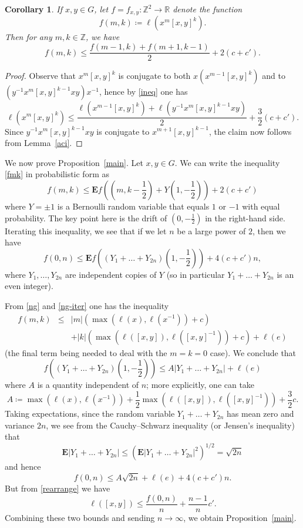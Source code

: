 \documentclass[11pt,a4paper,reqno]{amsart}
\numberwithin{equation}{section}
\theoremstyle{plain}
\newtheorem{corollary}[equation]{Corollary}
\theoremstyle{definition}
\newcommand\R{\mathbb{R}}
\newcommand\Z{\mathbb{Z}}
\newcommand\norm[1]{\ell({#1})}   %
\begin{document}
\begin{corollary}
If $x,y \in G$, let $f = f_{x,y}: \Z^2 \to \R$ denote the function
\[
f(m,k) \coloneqq \norm{ x^m [x,y]^k }.
\]
Then for any $m,k \in \Z$, we have
\begin{equation}\label{fmk}
 f(m,k) \leq \frac{f(m-1,k) + f(m+1,k-1)}{2} + 2(c + c').
\end{equation}
\end{corollary}

\begin{proof}
Observe that $x^m [x,y]^k$ is conjugate to both $x (x^{m-1} [x,y]^k)$ and
to $(y^{-1} x^m [x,y]^{k-1} xy) x^{-1}$, hence by \eqref{ineq} one has
\[
\norm{ x^m [x,y]^k } \leq \frac{\norm{ x^{m-1} [x,y]^k } + \norm{ y^{-1}
x^{m} [x,y]^{k-1} xy }}{2} + \frac{3}{2} (c + c').
\]
Since $y^{-1} x^{m} [x,y]^{k-1} xy $ is conjugate to $x^{m+1}
[x,y]^{k-1}$, the claim now follows from Lemma~\ref{aci}.
\end{proof}

We now prove Proposition~\ref{main}. Let $x,y \in G$.  We can
write the inequality \eqref{fmk} in probabilistic form as
\[
f(m,k) \leq {\mathbf E} f\left( \left(m,k-\frac{1}{2}\right) + Y
\left(1,-\frac{1}{2}\right) \right) + 2(c + c')
\]
where $Y = \pm 1$ is a Bernoulli random variable that equals $1$ or $-1$
with equal probability.  The key point here is the drift of $\left(0,
-\frac{1}{2} \right)$ in the right-hand side.
Iterating this inequality, we see that if we let
$n$ be a large power of $2$, then we have
\[
f( 0, n) \leq {\mathbf E} f\left( (Y_1 + \dots + Y_{2n}) \left(1,
-\frac{1}{2}\right) \right) + 4(c + c') n,
\]
where $Y_1,\dots,Y_{2n}$ are independent copies of $Y$ (so in particular
$Y_1+\dots+Y_{2n}$ is an even integer).

From \eqref{ng} and \eqref{ng-iter} one has the inequality
\begin{eqnarray*}
f(m,k) & \leq &
|m| \left(\max( \norm{x}, \norm{x^{-1}})+c\right)\\
& & + |k| \left(\max(
\norm{[x,y]}, \norm{[x,y]^{-1}})
+ c\right) + \norm{e}
\end{eqnarray*}
(the final term being needed to deal with the $m=k=0$ case).  We conclude
that
\[
f\left( (Y_1 + \dots + Y_{2n}) \left(1, -\frac{1}{2}\right) \right) \leq
A |Y_1 + \dots + Y_{2n}| + \norm{e}
\]
where $A$ is a quantity independent of $n$; more explicitly, one can take
\[
A \coloneqq \max\left( \norm{x}, \norm{x^{-1}}\right) + \frac{1}{2}
\max\left(\norm{[x,y]}, \norm{[x,y]^{-1}}\right)  + \frac{3}{2} c.
\]
Taking expectations, since the random variable $Y_1+\dots+Y_{2n}$ has
mean zero and variance $2n$, we see from the Cauchy--Schwarz inequality
(or Jensen's inequality) that
\[
{\mathbf E}|Y_1 + \dots + Y_{2n}|  \leq \left( {\mathbf E}|Y_1 + \dots +
Y_{2n}|^2 \right)^{1/2} = \sqrt{2n}
\]
and hence
\[
f(0,n) \leq A \sqrt{2n} + \norm{e} + 4 (c + c') n.
\]
But from \eqref{rearrange} we have
\[
\norm{[x,y]} \leq \frac{f(0,n)}{n}  + \frac{n-1}{n} c'.
\]
Combining these two bounds and sending $n \to \infty$, we obtain
Proposition~\ref{main}.
\end{document}
